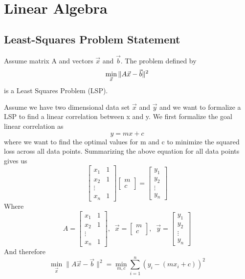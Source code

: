\section{Linear Algebra}

\subsection{Least-Squares Problem Statement} %
\label{sub:least_squares_problem_statement}

\begin{definition}
	Assume matrix A and vectors $\vec{x}$ and $\vec{b}$. The problem defined by
	\[
	\min_{\vec{x}}\|A\vec{x}-\vec{b}\|^2
	\]
	is a Least Squares Problem (LSP).
\end{definition}

\begin{example}
	Assume we have two dimensional data set $\vec{x}$ and $\vec{y}$ and we want to formalize a LSP to find a linear correlation between x and y. We first formalize the goal linear correlation as
	\[
	y=mx+c
	\]
	where we want to find the optimal values for m and c to minimize the squared loss across all data points. Summarizing the above equation for all data points gives us
	\[
	\begin{bmatrix}
		x_1 & 1\\x_2&1\\\vdots\\x_n&1
	\end{bmatrix}
	\begin{bmatrix}
		m\\c
	\end{bmatrix}=
	\begin{bmatrix}
		y_1\\y_2\\\vdots\\y_n
	\end{bmatrix}
	\]
	Where
	\[
	A = \begin{bmatrix}
		x_1 & 1\\x_2&1\\\vdots\\x_n&1
	\end{bmatrix},\;\;
	\vec{x} = \begin{bmatrix}
		m\\c
	\end{bmatrix}, \;\;
	\Vec{y} = \begin{bmatrix}
		y_1\\y_2\\\vdots\\y_n
	\end{bmatrix}
	\]
	And therefore
	\[
	\min_{\vec{x}}\|A\vec{x}-\vec{b}\|^2 = \min_{m,c}\sum_{i=1}^n(y_i-(mx_i+c))^2
	\]
\end{example}

